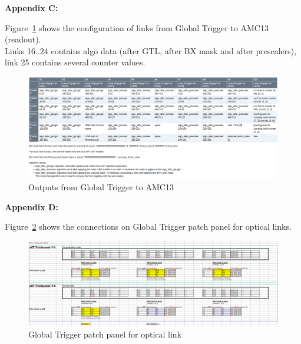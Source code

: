 \textbf{Appendix C:}

Figure~\ref{fig:app:ugt_outputs} shows the configuration of links from Global Trigger to AMC13 (readout).\\
Links 16..24 contains algo data (after GTL, after BX mask and after prescalers), link 25 contains several counter values.

\begin{figure}[htb]
\centering
\includegraphics[width=15cm]{figures/ugt_outputs}
\caption{Outputs from Global Trigger to AMC13}
\label{fig:app:ugt_outputs}
\end{figure}

\clearpage

\textbf{Appendix D:}

Figure~\ref{fig:app:ugt_pp} shows the connections on Global Trigger patch panel for optical links.

\begin{figure}[htb]
\centering
\includegraphics[width=15cm]{figures/ugt_patchpanel}
\caption{Global Trigger patch panel for optical link}
\label{fig:app:ugt_pp}
\end{figure}

\clearpage
